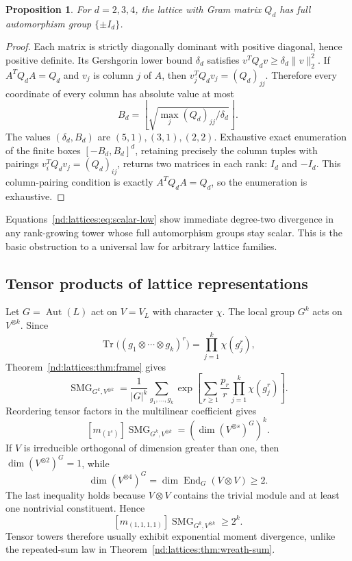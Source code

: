 \documentclass[10pt]{article}
\newcommand{\Tr}{\operatorname{Tr}}
\newcommand{\SMG}{\operatorname{SMG}}
\newcommand{\MGF}{\SMG}
\newcommand{\Aut}{\operatorname{Aut}}
\newcommand{\End}{\operatorname{End}}
\newtheorem{proposition}{Proposition}
\begin{document}
\begin{proposition}\label{nd:lattices:prop:scalar-grams}
For $d=2,3,4$, the lattice with Gram matrix $Q_d$ has full automorphism group
$\{\pm I_d\}$.
\end{proposition}

\begin{proof}
Each matrix is strictly diagonally dominant with positive diagonal, hence
positive definite.  Its Gershgorin lower bound $\delta_d$ satisfies
$v^TQ_dv\ge\delta_d\|v\|_2^2$.  If $A^TQ_dA=Q_d$ and $v_j$ is column $j$ of
$A$, then $v_j^TQ_dv_j=(Q_d)_{jj}$.  Therefore every coordinate of every
column has absolute value at most
\[
 B_d=\left\lfloor\sqrt{\max_j(Q_d)_{jj}/\delta_d}\right\rfloor.
\]
The values $(\delta_d,B_d)$ are $(5,1),(3,1),(2,2)$.  Exhaustive exact
enumeration of the finite boxes $[-B_d,B_d]^d$, retaining precisely the
column tuples with pairings $v_i^TQ_dv_j=(Q_d)_{ij}$, returns two matrices in
each rank: $I_d$ and $-I_d$.  This column-pairing condition is exactly
$A^TQ_dA=Q_d$, so the enumeration is exhaustive.
\end{proof}

Equations~\eqref{nd:lattices:eq:scalar-low} show immediate degree-two divergence in any
rank-growing tower whose full automorphism groups stay scalar.  This is the
basic obstruction to a universal law for arbitrary lattice families.

\subsection{Tensor products of lattice representations}

Let $G=\Aut(L)$ act on $V=V_L$ with character $\chi$.  The local group $G^k$
acts on $V^{\otimes k}$.  Since
\[
 \Tr\bigl((g_1\otimes\cdots\otimes g_k)^r\bigr)
 =\prod_{j=1}^k\chi(g_j^r),
\]
Theorem~\ref{nd:lattices:thm:frame} gives
\begin{equation}\label{nd:lattices:eq:tensor-local}
 \boxed{\MGF_{G^k,V^{\otimes k}}
 =\frac1{|G|^k}\sum_{g_1,\ldots,g_k}
 \exp\!\left[\sum_{r\ge1}\frac{p_r}{r}
 \prod_{j=1}^k\chi(g_j^r)\right].}
\end{equation}
Reordering tensor factors in the multilinear coefficient gives
\begin{equation}\label{nd:lattices:eq:tensor-multilinear}
 \boxed{[m_{(1^s)}]\MGF_{G^k,V^{\otimes k}}
 =\left(\dim(V^{\otimes s})^G\right)^k.}
\end{equation}
If $V$ is irreducible orthogonal of dimension greater than one, then
$\dim(V^{\otimes2})^G=1$, while
\[
 \dim(V^{\otimes4})^G=\dim\End_G(V\otimes V)\ge2.
\]
The last inequality holds because $V\otimes V$ contains the trivial module
and at least one nontrivial constituent.  Hence
\begin{equation}\label{nd:lattices:eq:tensor-growth}
 [m_{(1,1,1,1)}]\MGF_{G^k,V^{\otimes k}}\ge2^k.
\end{equation}
Tensor towers therefore usually exhibit exponential moment divergence,
unlike the repeated-sum law in Theorem~\ref{nd:lattices:thm:wreath-sum}.
\end{document}
